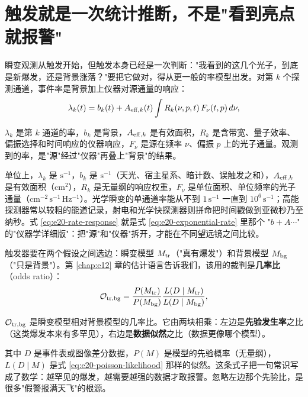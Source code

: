\section{触发就是一次统计推断，不是"看到亮点就报警"}
\label{sec:e20-trigger}

瞬变观测从触发开始，但触发本身已经是一次判断："我看到的这几个光子，到底是新爆发，还是背景涨落？"要把它做对，得从更一般的率模型出发。对第 \(k\) 个探测通道，事件率是背景加上仪器对源通量的响应：
\begin{equation}
  \lambda_k(t)=b_k(t)+A_{{\rm eff},k}(t)
  \int R_k(\nu,p,t)\,F_\nu(t,p)\,d\nu ,
  \label{eq:e20-rate-response}
\end{equation}
\begin{formulaexplain}
\(\lambda_k\) 是第 \(k\) 通道的率，\(b_k\) 是背景，\(A_{{\rm eff},k}\) 是有效面积，\(R_k\) 是含带宽、量子效率、偏振选择和时间响应的仪器响应，\(F_\nu\) 是源在频率 \(\nu\)、偏振 \(p\) 上的光子通量。观测到的率，是"源"经过"仪器"再叠上"背景"的结果。
\end{formulaexplain}
单位上，\(\lambda_k\) 是 \(\mathrm{s^{-1}}\)，\(b_k\) 是 \(\mathrm{s^{-1}}\)（天光、宿主星系、暗计数、误触发之和），\(A_{{\rm eff},k}\) 是有效面积（\(\mathrm{cm^2}\)），\(R_k\) 是无量纲的响应权重，\(F_\nu\) 是单位面积、单位频率的光子通量（\(\mathrm{cm^{-2}\,s^{-1}\,Hz^{-1}}\)）。光学瞬变的单通道率能从不到 \(1\,\mathrm{s^{-1}}\) 一直到 \(10^6\,\mathrm{s^{-1}}\)；高能探测器常以较粗的能道记录，射电和光学快探测器则拼命把时间戳做到亚微秒乃至纳秒。式 \eqref{eq:e20-rate-response} 就是式 \eqref{eq:e20-exponential-rate} 里那个 "\(b+A\cdots\)" 的"仪器学详细版"：把"源"和"仪器"拆开，才能在不同望远镜之间比较。

触发器要在两个假设之间选边：瞬变模型 \(M_{\rm tr}\)（"真有爆发"）和背景模型 \(M_{\rm bg}\)（"只是背景"）。第 \ref{chap:e12} 章的估计语言告诉我们，该用的裁判是\textbf{几率比}（odds ratio）：
\begin{equation}
  {\cal O}_{\rm tr,bg}
  =
  \frac{P(M_{\rm tr})}{P(M_{\rm bg})}
  \frac{L(D\mid M_{\rm tr})}{L(D\mid M_{\rm bg})},
  \label{eq:e20-trigger-odds}
\end{equation}
\begin{formulaexplain}
\({\cal O}_{\rm tr,bg}\) 是瞬变模型相对背景模型的几率比。它由两块相乘：左边是\textbf{先验发生率}之比（这类爆发本来有多罕见），右边是\textbf{数据似然}之比（数据更像哪个模型）。
\end{formulaexplain}
其中 \(D\) 是事件表或图像差分数据，\(P(M)\) 是模型的先验概率（无量纲），\(L(D\mid M)\) 是式 \eqref{eq:e20-poisson-likelihood} 那样的似然。这条式子把一句常识写成了数学：越罕见的爆发，越需要越强的数据才敢报警。忽略左边那个先验比，是很多"假警报满天飞"的根源。

